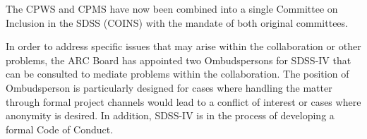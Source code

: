 The CPWS and CPMS have now been combined into a single Committee on
Inclusion in the SDSS (COINS) with the mandate of both original
committees.

In order to address specific issues that may arise within the
collaboration or other problems, the ARC Board has appointed two
Ombudspersons for SDSS-IV that can be consulted to mediate problems
within the collaboration. The position of Ombudsperson is particularly
designed for cases where handling the matter through formal project
channels would lead to a conflict of interest or cases where anonymity
is desired. In addition, SDSS-IV is in the process of developing a
formal Code of Conduct.

